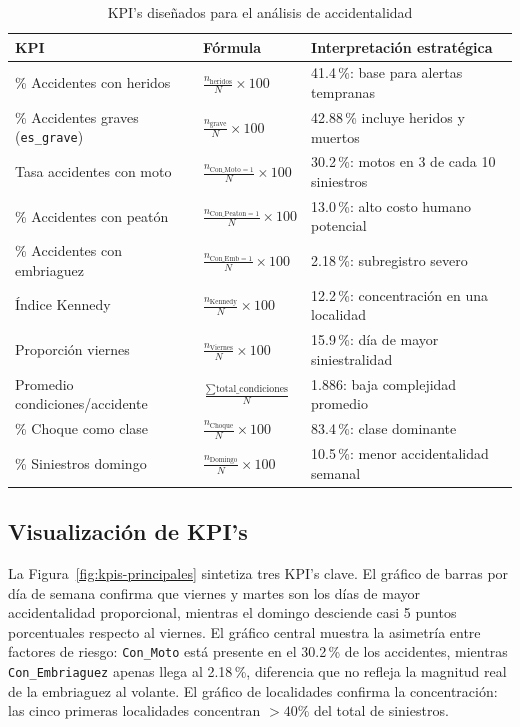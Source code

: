\documentclass[11pt,a4paper]{article}
\begin{document}
\begin{table}[H]
\centering
\caption{KPI's diseñados para el análisis de accidentalidad}
\label{tab:kpis}
\small
\begin{tabular}{@{}p{4.5cm}p{3.5cm}p{5cm}@{}}
\toprule
KPI & Fórmula & Interpretación estratégica \\
\midrule
\% Accidentes con heridos & $\frac{n_{\text{heridos}}}{N} \times 100$ & 41.4\,\%: base para alertas tempranas \\
\% Accidentes graves (\texttt{es\_grave}) & $\frac{n_{\text{grave}}}{N} \times 100$ & 42.88\,\% incluye heridos y muertos \\
Tasa accidentes con moto & $\frac{n_{\text{Con\_Moto}=1}}{N} \times 100$ & 30.2\,\%: motos en 3 de cada 10 siniestros \\
\% Accidentes con peatón & $\frac{n_{\text{Con\_Peaton}=1}}{N} \times 100$ & 13.0\,\%: alto costo humano potencial \\
\% Accidentes con embriaguez & $\frac{n_{\text{Con\_Emb}=1}}{N} \times 100$ & 2.18\,\%: subregistro severo \\
Índice Kennedy & $\frac{n_{\text{Kennedy}}}{N} \times 100$ & 12.2\,\%: concentración en una localidad \\
Proporción viernes & $\frac{n_{\text{Viernes}}}{N} \times 100$ & 15.9\,\%: día de mayor siniestralidad \\
Promedio condiciones/accidente & $\frac{\sum \text{total\_condiciones}}{N}$ & 1.886: baja complejidad promedio \\
\% Choque como clase & $\frac{n_{\text{Choque}}}{N} \times 100$ & 83.4\,\%: clase dominante \\
\% Siniestros domingo & $\frac{n_{\text{Domingo}}}{N} \times 100$ & 10.5\,\%: menor accidentalidad semanal \\
\bottomrule
\end{tabular}
\end{table}

\subsection{Visualización de KPI's}

La Figura~\ref{fig:kpis-principales} sintetiza tres KPI's clave. El gráfico de barras por
día de semana confirma que viernes y martes son los días de mayor accidentalidad
proporcional, mientras el domingo desciende casi 5 puntos porcentuales respecto al viernes.
El gráfico central muestra la asimetría entre factores de riesgo: \texttt{Con\_Moto} está
presente en el 30.2\,\% de los accidentes, mientras \texttt{Con\_Embriaguez} apenas llega
al 2.18\,\%, diferencia que no refleja la magnitud real de la embriaguez al volante. El
gráfico de localidades confirma la concentración: las cinco primeras localidades concentran
$> 40\%$ del total de siniestros.
\end{document}
